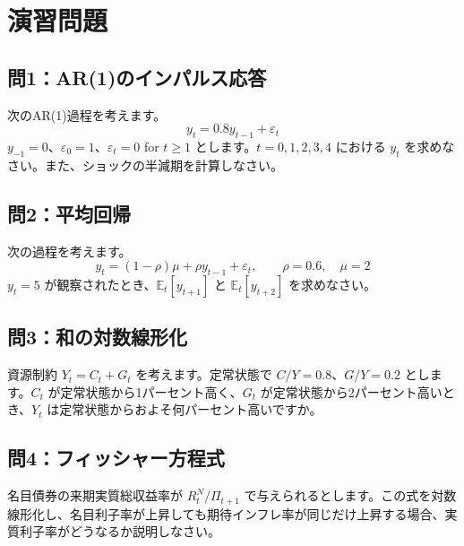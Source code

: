 \documentclass[
  japanese,
  lualatex,
  ja=standard,
  12pt,
  a4paper]{ltjsarticle}
\begin{document}
\section{演習問題}\label{ux6f14ux7fd2ux554fux984c}

\subsection{問1：AR(1)のインパルス応答}\label{ux554f1ar1ux306eux30a4ux30f3ux30d1ux30ebux30b9ux5fdcux7b54}

次のAR(1)過程を考えます。 \[
y_t=0.8y_{t-1}+\varepsilon_t
\] \(y_{-1}=0\)、\(\varepsilon_0=1\)、\(\varepsilon_t=0\) for
\(t\geq 1\) とします。\(t=0,1,2,3,4\) における \(y_t\)
を求めなさい。また、ショックの半減期を計算しなさい。

\subsection{問2：平均回帰}\label{ux554f2ux5e73ux5747ux56deux5e30}

次の過程を考えます。 \[
y_t=(1-\rho)\mu+\rho y_{t-1}+\varepsilon_t,
\qquad
\rho=0.6,\quad \mu=2
\] \(y_t=5\) が観察されたとき、\(\mathbb{E}_t[y_{t+1}]\) と
\(\mathbb{E}_t[y_{t+2}]\) を求めなさい。

\subsection{問3：和の対数線形化}\label{ux554f3ux548cux306eux5bfeux6570ux7ddaux5f62ux5316}

資源制約 \(Y_t=C_t+G_t\) を考えます。定常状態で \(C/Y=0.8\)、\(G/Y=0.2\)
とします。\(C_t\) が定常状態から1パーセント高く、\(G_t\)
が定常状態から2パーセント高いとき、\(Y_t\)
は定常状態からおよそ何パーセント高いですか。

\subsection{問4：フィッシャー方程式}\label{ux554f4ux30d5ux30a3ux30c3ux30b7ux30e3ux30fcux65b9ux7a0bux5f0f}

名目債券の来期実質総収益率が \(R_t^N/\Pi_{t+1}\)
で与えられるとします。この式を対数線形化し、名目利子率が上昇しても期待インフレ率が同じだけ上昇する場合、実質利子率がどうなるか説明しなさい。
\end{document}
